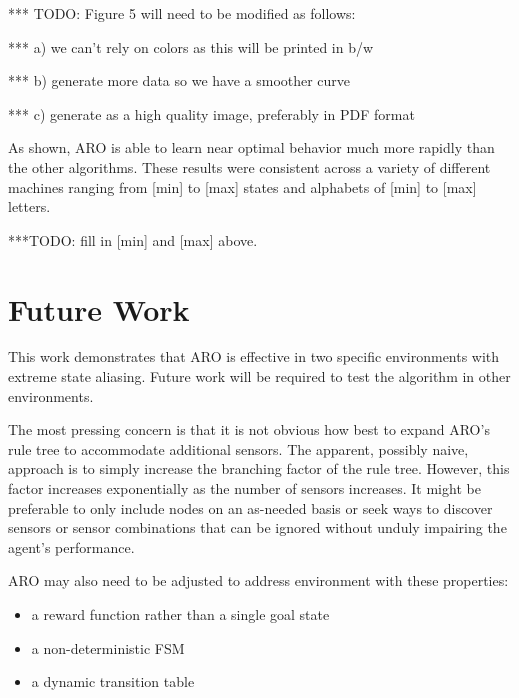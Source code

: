 \documentclass[letterpaper]{article} %
\begin{document}
*** TODO: Figure 5 will need to be modified as follows:

***    a) we can't rely on colors as this will be printed in b/w

***    b) generate more data so we have a smoother curve

***    c) generate as a high quality image, preferably in PDF format


As shown, ARO is able to learn near optimal behavior much more rapidly
than the other algorithms.  These results were consistent across a
variety of different machines ranging from [min] to [max] states and
alphabets of [min] to [max] letters.

***TODO:  fill in [min] and [max] above.

\section{Future Work}

This work demonstrates that ARO is effective in two specific
environments with extreme state aliasing.  Future work will be
required to test the algorithm in other environments.

The most pressing concern is that it is not obvious how best to expand
ARO's rule tree to accommodate additional sensors.  The apparent,
possibly naive, approach is to simply increase the branching factor of
the rule tree.  However, this factor increases exponentially as the
number of sensors increases.  It might be preferable to only include
nodes on an as-needed basis or seek ways to discover sensors or sensor
combinations that can be ignored without unduly impairing the agent's
performance.

ARO may also need to be adjusted to address environment with these
properties:
\begin{itemize}
\item a reward function rather than a single goal state
\item a non-deterministic FSM
\item a dynamic transition table
\end{itemize}

\begin{quote}
\begin{small}


\end{small}
\end{quote}
\end{document}
